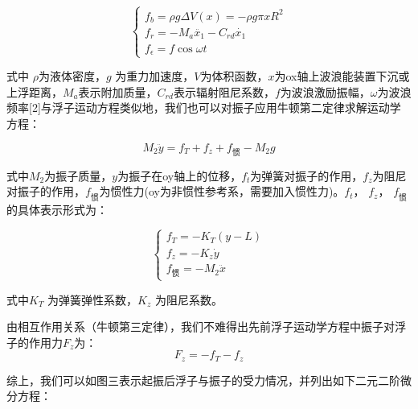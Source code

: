 \documentclass[12pt,utf8]{article}
\begin{document}
\begin{equation}
	\begin{cases}
		f_b = \rho g \Delta V(x) = - \rho g \pi x R^2 \\
		f_r = -M_a \ddot{x_1}-C_{rd} \dot{x_1} \\
		f_\epsilon = f \cos \omega t
	\end{cases}
\end{equation}

式中 $\rho$为液体密度，$g$ 为重力加速度，$V$为体积函数，$x$为ox轴上波浪能装置下沉或上浮距离，$M_a$表示附加质量，$C_{rd}$表示辐射阻尼系数，$f$为波浪激励振幅，$\omega$为波浪频率[2]与浮子运动方程类似地，我们也可以对振子应用牛顿第二定律求解运动学方程：

\begin{equation}
	M_2 \ddot{y} = f_T + f_z + f_{\text{惯}} - M_2 g
\end{equation}

式中$M_2$为振子质量，$y$为振子在oy轴上的位移，$f_t$为弹簧对振子的作用，$f_z$为阻尼对振子的作用，$ f_{\text{惯}}$为惯性力(oy为非惯性参考系，需要加入惯性力)。$f_t$， $f_z$， $ f_{\text{惯}}$的具体表示形式为：

\begin{equation}
	\begin{cases}
		f_T = -K_T(y-L) \\
		f_z = -K_z \dot{y} \\
		f_{\text{惯}} = -M_2 \ddot{x}
	\end{cases}
\end{equation}

式中$K_T$ 为弹簧弹性系数，$K_z$ 为阻尼系数。

由相互作用关系（牛顿第三定律），我们不难得出先前浮子运动学方程中振子对浮子的作用力$F_z$为：
\begin{equation}
	F_z = -f_T - f_z
\end{equation} 

综上，我们可以如图三表示起振后浮子与振子的受力情况，并列出如下二元二阶微分方程：
\end{document}
